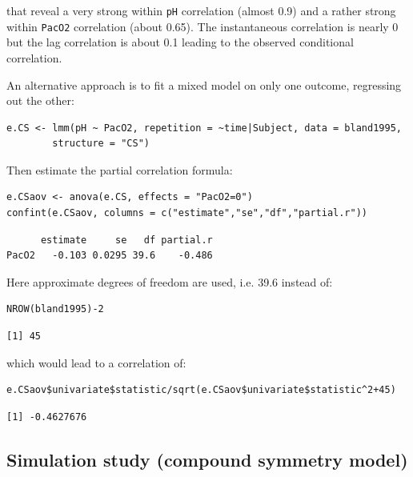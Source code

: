 \documentclass[12pt]{article}
\begin{document}
that reveal a very strong within \texttt{pH} correlation (almost 0.9) and a
rather strong within \texttt{PacO2} correlation (about 0.65). The
instantaneous correlation is nearly 0 but the lag correlation is about
0.1 leading to the observed conditional correlation.

\bigskip

An alternative approach is to fit a mixed model on only one outcome,
regressing out the other:
\lstset{language=r,label= ,caption= ,captionpos=b,numbers=none}
\begin{lstlisting}
e.CS <- lmm(pH ~ PacO2, repetition = ~time|Subject, data = bland1995,
	    structure = "CS")
\end{lstlisting}

Then estimate the partial correlation formula:
\lstset{language=r,label= ,caption= ,captionpos=b,numbers=none}
\begin{lstlisting}
e.CSaov <- anova(e.CS, effects = "PacO2=0")
confint(e.CSaov, columns = c("estimate","se","df","partial.r"))
\end{lstlisting}

\begin{verbatim}
      estimate     se   df partial.r
PacO2   -0.103 0.0295 39.6    -0.486
\end{verbatim}


\clearpage

Here approximate degrees of freedom are used, i.e. 39.6 instead of:
\lstset{language=r,label= ,caption= ,captionpos=b,numbers=none}
\begin{lstlisting}
NROW(bland1995)-2
\end{lstlisting}

\begin{verbatim}
[1] 45
\end{verbatim}


which would lead to a correlation of:
\lstset{language=r,label= ,caption= ,captionpos=b,numbers=none}
\begin{lstlisting}
e.CSaov$univariate$statistic/sqrt(e.CSaov$univariate$statistic^2+45)
\end{lstlisting}

\begin{verbatim}
[1] -0.4627676
\end{verbatim}

\subsection{Simulation study (compound symmetry model)}
\label{sec:org1291cfc}
\end{document}
